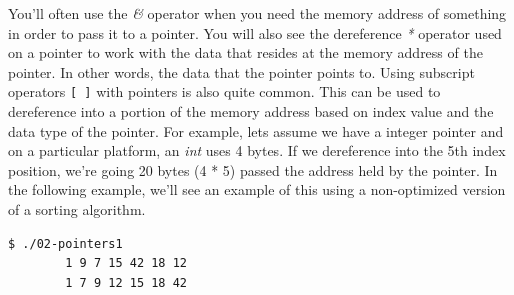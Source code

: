 \documentclass[../main.tex]{subfiles}
\begin{document}
	You'll often use the \textit{\&} operator when you need the memory address of something in order to pass it to a pointer.  You will also see the dereference \textit{*} operator used on a pointer to work with the data that resides at the memory address of the pointer.  In other words, the data that the pointer points to.  Using subscript operators \texttt{[ ]} with pointers is also quite common.  This can be used to dereference into a portion of the memory address based on index value and the data type of the pointer.  For example, lets assume we have a integer pointer and on a particular platform, an \textit{int} uses 4 bytes.  If we dereference into the 5th index position, we're going 20 bytes (4 * 5) passed the address held by the pointer.  In the following example, we'll see an example of this using a non-optimized version of a sorting algorithm.\\
	
	
	
	\begin{lstlisting}[language=bash, numbers=none]
		$ ./02-pointers1 
		1 9 7 15 42 18 12  
		1 7 9 12 15 18 42
	\end{lstlisting}
	
\end{document}
